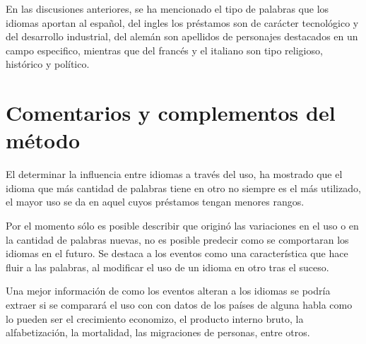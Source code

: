 En las discusiones anteriores, se ha mencionado el tipo de palabras que los idiomas aportan al español, del ingles los préstamos son de carácter tecnológico y del desarrollo industrial, del alemán son apellidos de personajes destacados en un campo especifico, mientras que del francés y el italiano son tipo religioso, histórico y político. 






\section{Comentarios y complementos del método} %


El determinar la influencia entre idiomas a través del uso, ha mostrado que el idioma que más cantidad de palabras tiene en otro no siempre es el más utilizado, el mayor uso se da en aquel cuyos préstamos tengan menores rangos. 

Por el momento sólo es posible describir que originó las variaciones en el uso o en la cantidad de palabras nuevas, no es posible predecir como se comportaran los idiomas en el futuro. Se destaca a los eventos como una característica que  hace fluir a las palabras, al modificar el uso de un idioma en otro tras el suceso. 


Una mejor información de como los eventos alteran a los idiomas se podría extraer si se comparará el uso con con  datos de los países de alguna habla como lo pueden ser  el crecimiento economizo, el producto interno bruto, la alfabetización, la mortalidad, las migraciones de personas, entre otros. 



 





